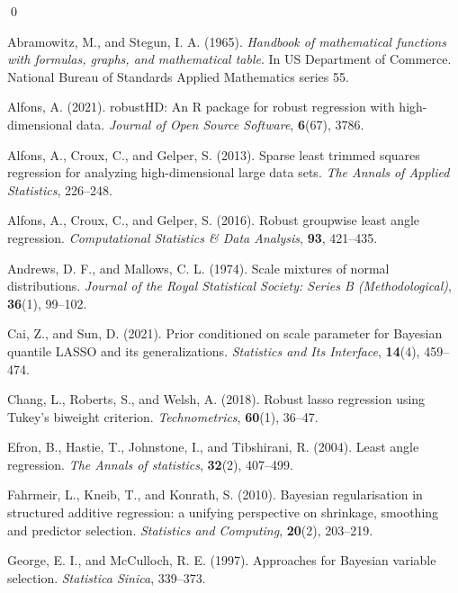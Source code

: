 \documentclass[11pt]{article}
\theoremstyle{plain}
\theoremstyle{definition}
\begin{document}
\qed



\begin{thebibliography}{99}

 Abramowitz, M., and Stegun, I. A. (1965). {\it Handbook of mathematical functions with formulas, graphs, and mathematical table}. In US Department of Commerce. National Bureau of Standards Applied Mathematics series 55.

 Alfons, A. (2021). robustHD: An R package for robust regression with high-dimensional data. {\it Journal of Open Source Software}, {\bf 6}(67), 3786.

 Alfons, A., Croux, C., and Gelper, S. (2013). Sparse least trimmed squares regression for analyzing high-dimensional large data sets. {\it The Annals of Applied Statistics}, 226--248.

 Alfons, A., Croux, C., and Gelper, S. (2016). Robust groupwise least angle regression. {\it Computational Statistics \& Data Analysis}, {\bf 93}, 421--435.

 Andrews, D. F., and Mallows, C. L. (1974). Scale mixtures of normal distributions. {\it Journal of the Royal Statistical Society: Series B (Methodological)}, {\bf 36}(1), 99--102.

 Cai, Z., and Sun, D. (2021). Prior conditioned on scale parameter for Bayesian quantile LASSO and its generalizations. {\it Statistics and Its Interface}, {\bf 14}(4), 459--474.

 Chang, L., Roberts, S., and Welsh, A. (2018). Robust lasso regression using Tukey's biweight criterion. {\it Technometrics}, {\bf 60}(1), 36--47.

 Efron, B., Hastie, T., Johnstone, I., and Tibshirani, R. (2004). Least angle regression. {\it The Annals of statistics}, {\bf 32}(2), 407--499.

 Fahrmeir, L., Kneib, T., and Konrath, S. (2010). Bayesian regularisation in structured additive regression: a unifying perspective on shrinkage, smoothing and predictor selection. {\it Statistics and Computing}, {\bf 20}(2), 203--219.

 George, E. I., and McCulloch, R. E. (1997). Approaches for Bayesian variable selection. {\it Statistica Sinica}, 339--373.


\end{thebibliography}
\end{document}
